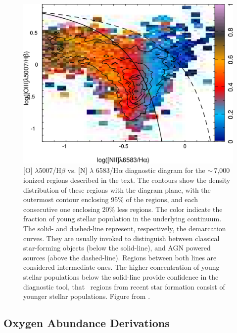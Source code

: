 \documentclass[11pt, a4paper, onecolumn]{article}
\begin{document}
\begin{multicols}{2}
\begin{figure}[!ht]
        \includegraphics[scale=0.4]{figures/sanchez14_figure4.pdf}

        \caption{\label{fig:sanchez_b} [O\iii] $\lambda$5007/H$\beta$ vs.
            [N\ii] $\lambda$ 6583/H$\alpha$ diagnostic diagram for the
            $\sim$\,7,000 ionized regions described in the text. The contours
            show the density distribution of these regions with the diagram
            plane, with the outermost contour enclosing 95\% of the regions,
            and each consecutive one enclosing 20\% less regions. The color
            indicate the fraction of young stellar population in the underlying
            continuum. The solid- and dashed-line represent, respectively, the
            \citet{kauffmann03} demarcation curves. They are usually invoked to
            distinguish between classical star-forming objects (below the
            solid-line), and AGN powered sources (above the dashed-line).
            Regions between both lines are considered intermediate ones.  The
            higher concentration of young stellar populations below the
        solid-line provide confidence in the diagnostic tool, that \hii\
    regions from recent star formation consist of younger stellar populations.
Figure from \citet{sanchez14}.\/}

    \end{figure}
    
\subsection{Oxygen Abundance Derivations}


\end{multicols}
\end{document}
